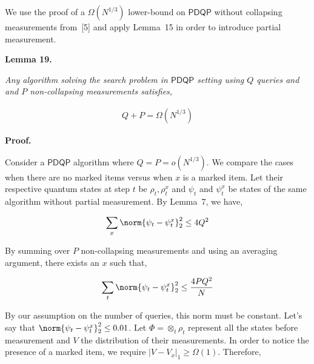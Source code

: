 \documentclass[10pt,a4paper]{article}
\begin{document}
We use the proof of a $\Omega(N^{1/3})$ lower-bound on $\mathsf{PDQP}$ without collapsing measurements from [5] and apply Lemma 15 in order to introduce partial measurement.\par





\par\medskip\noindent\textbf{
\textbf{Lemma 19}\textbf{.}
}\par



\emph{Any algorithm solving the search problem in $\mathsf{PDQP}$ setting using $Q$ queries and and $P$ non-collapsing measurements satisfies,}\par


\[\begin{gathered}
\displaystyle Q+P=\Omega(N^{1/3})
\end{gathered}\]






\par\medskip\noindent\textbf{Proof.}\par




Consider a $\mathsf{PDQP}$ algorithm where $Q=P=o(N^{1/3})$. We compare the cases when there are no marked items versus when $x$ is a marked item. Let their respective quantum states at step $t$ be $\rho_{t},\rho_{t}^{x}$ and $\psi_{t}$ and $\psi_{t}^{x}$ be states of the same algorithm without partial measurement. By Lemma 7, we have,\par


\[\begin{gathered}
\displaystyle\sum_{x}\norm{\psi_{t}-\psi_{t}^{x}}^{2}_{2}\leq 4Q^{2}
\end{gathered}\]




By summing over $P$ non-collapsing measurements and using an averaging argument, there exists an $x$ such that,\par


\[\begin{gathered}
\displaystyle\sum_{t}\norm{\psi_{t}-\psi_{t}^{x}}^{2}_{2}\leq\frac{4PQ^{2}}{N}
\end{gathered}\]




By our assumption on the number of queries, this norm must be constant. Let’s say that $\norm{\psi_{t}-\psi_{t}^{x}}_{2}^{2}\leq 0.01$. Let $\Phi=\otimes_{t}\rho_{t}$ represent all the states before measurement and $V$ the distribution of their measurements. In order to notice the presence of a marked item, we require $|V-V_{x}|_{1}\geq\Omega(1)$. Therefore,\par
\end{document}
